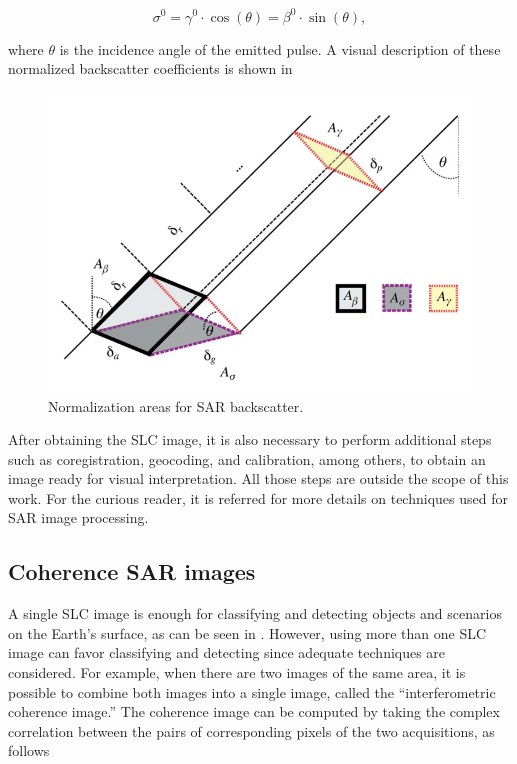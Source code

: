 \begin{equation}
    \sigma^0 = \gamma^0 \cdot \cos(\theta) = \beta^0 \cdot \sin(\theta),
\end{equation}

\noindent
where $\theta$ is the incidence angle of the emitted pulse. A visual description of these normalized backscatter coefficients is shown in 

\begin{figure}[H]
    \centering
    \includegraphics[width=0.8\linewidth]{Cap1-Bib-Review/retang.png}
    \caption{Normalization areas for SAR backscatter. \cite{Small}}
    \label{fig:normalization_areas}
\end{figure}

After obtaining the SLC image, it is also necessary to perform additional steps such as coregistration, geocoding, and calibration, among others, to obtain an image ready for visual interpretation. All those steps are outside the scope of this work. For the curious reader, it is referred \cite{Alberto} for more details on techniques used for SAR image processing. 

\subsection{Coherence SAR images}
A single SLC image is enough for classifying and detecting objects and scenarios on the Earth's surface, as can be seen in \cite{Paolathesis,Andreathesis, 78, 79, rfsar}. However, using more than one SLC image can favor classifying and detecting since adequate techniques are considered.  For example, when there are two images of the same area, it is possible to combine both images into a single image, called the ``interferometric coherence image.'' The coherence image can be computed by taking the complex correlation between the pairs of corresponding pixels of the two acquisitions, as follows

